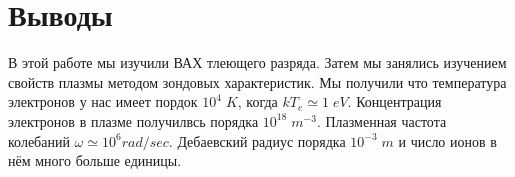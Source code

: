 \documentclass[11pt]{article}
\begin{document}
\section{Выводы}

    В этой работе мы изучили ВАХ тлеющего разряда. Затем мы занялись изучением свойств плазмы методом зондовых характеристик. Мы получили что температура электронов у нас имеет пордок \(10^4\; K\), когда \(kT_e \simeq 1\; eV\). Концентрация электронов в плазме получилвсь порядка \(10^18\; m^{-3}\). Плазменная частота колебаний \(\omega \simeq 10^6 rad/sec\). Дебаевский радиус порядка \(10^{-3}\; m\) и число ионов в нём много больше единицы.
\end{document}
